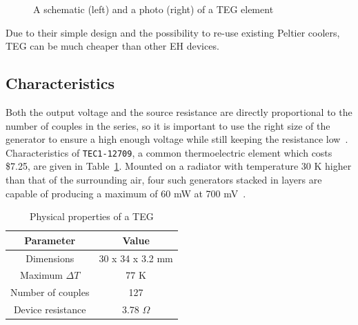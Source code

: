 \documentclass[a4paper,10pt]{article}
\begin{document}
\begin{figure}[h]
\caption{A schematic (left) and a photo (right) of a \ac{TEG} element~\cite{Salerno10,wiki:teg}}
\label{fig:teg-schematic}
\end{figure}

Due to their simple design and the possibility to re-use existing Peltier coolers, \ac{TEG} can be much cheaper than other \ac{EH} devices. 

\subsection{Characteristics}

Both the output voltage and the source resistance are directly proportional to the number of couples in the series, so it is important to use the right size of the generator to ensure a high enough voltage while still keeping the resistance low~\cite{Salerno10}. Characteristics of \texttt{TEC1-12709}, a common thermoelectric element which costs \$7.25, are given in Table~\ref{tab:teg-radiator}. Mounted on a radiator with temperature 30 K higher than that of the surrounding air, four such generators stacked in layers are capable of producing a maximum of 60 mW at 700 mV~\cite{teg-wsn-ieee}. 

\begin{table}[h]
  \centering
  \begin{tabular}{|c|c|}
\hline
    Parameter & Value \\
\hline
Dimensions & 30 x 34 x 3.2 mm \\
Maximum $\Delta T$ & 77 K \\
Number of couples & 127 \\
Device resistance & 3.78 $\Omega$ \\
\hline
  \end{tabular}
\caption{Physical properties of a \ac{TEG}}
\label{tab:teg-radiator}
\end{table}
\end{document}
